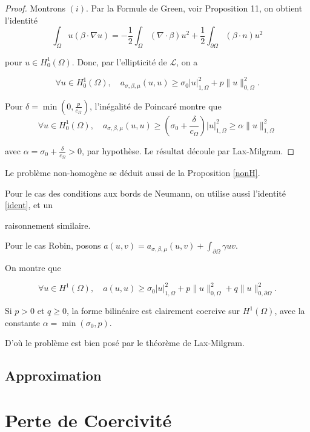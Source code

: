 \begin{proof}
Montrons  $(i)$.  Par la Formule de Green, voir Proposition 11, on obtient l'identité 
\begin{equation}\label{ident}
\int_{\Omega} u(\beta \cdot \nabla u)=-\frac{1}{2} \int_{\Omega}(\nabla \cdot \beta) u^{2}+\frac{1}{2} \int_{\partial \Omega}(\beta \cdot n) u^{2}
\end{equation}

pour $u\in H^1_0(\Omega)$.   Donc, par l'ellipticité  de  $\mathcal{L}$, on a 

$$
\forall u \in H_{0}^{1}(\Omega), \quad a_{\sigma, \beta, \mu}(u, u) \geq \sigma_{0}|u|_{1, \Omega}^{2}+p\|u\|_{0, \Omega}^{2}.
$$

Pour $\delta=\min \left(0, \frac{p}{c_{\Omega}}\right)$,  l'inégalité de Poincaré montre que 
$$
\forall u \in H_{0}^{1}(\Omega), \quad a_{\sigma, \beta, \mu}(u, u) \geq\left(\sigma_{0}+\frac{\delta}{c_{\Omega}}\right)|u|_{1, \Omega}^{2} \geq \alpha\|u\|_{1, \Omega}^{2}
$$

avec 
$\alpha=\sigma_{0}+\frac{\delta}{c_{\Omega}}>0$, par hypothèse.  Le résultat découle par  Lax-Milgram. 
\end{proof}


Le problème non-homogène se déduit aussi de  la Proposition  \ref{nonH}.


Pour le cas des conditions aux bords de  Neumann, on utilise aussi l'identité  \eqref{ident}, et un 

raisonnement similaire.


Pour le cas Robin, posons  $a(u, v)=a_{\sigma, \beta, \mu}(u, v)+\int_{\partial \Omega} \gamma u v .$ 

On montre que  

$$
\forall u \in H^{1}(\Omega), \quad a(u, u) \geq \sigma_{0}|u|_{1, \Omega}^{2}+p\|u\|_{0, \Omega}^{2}+q\|u\|_{0, \partial \Omega}^{2}. 
$$

Si $p>0$ et   $q \geq 0$, la forme bilinéaire est  clairement  coercive sur $H^{1}(\Omega)$, avec la constante  $\alpha=\min \left(\sigma_{0}, p\right)$. 

D'où le problème est bien posé par  le théorème de Lax-Milgram.

\subsection{Approximation}


\section{Perte de Coercivité}

